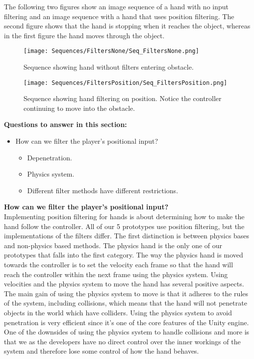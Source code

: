 The following two figures show an image sequence of a hand with no input filtering and an image sequence with a hand that uses position filtering. The second figure shows that the hand is stopping when it reaches the object, whereas in the first figure the hand moves through the object.

\begin{figure}[H]
\centering
\texttt{[image: Sequences/FiltersNone/Seq\_FiltersNone.png]}
\caption{Sequence showing hand without filters entering obstacle.}
\label{fig:filtersNone}
\end{figure}

\begin{figure}[H]
\centering
\texttt{[image: Sequences/FiltersPosition/Seq\_FiltersPosition.png]}
\caption{Sequence showing hand filtering on position. Notice the controller continuing to move into the obstacle.}
\label{fig:filtersPosition}
\end{figure}

\textbf{Questions to answer in this section:}
\begin{itemize}
\setlength\itemsep{-0.1cm}
\item How can we filter the player's positional input?
\begin{itemize}
\setlength\itemsep{-0.1cm}
\item Depenetration.
\item Physics system.
\item Different filter methods have different restrictions.
\end{itemize}
\end{itemize}

\textbf{How can we filter the player's positional input?}\\
Implementing position filtering for hands is about determining how to make the hand follow the controller. All of our 5 prototypes use position filtering, but the implementations of the filters differ. The first distinction is between physics bases and non-physics based methods. The physics hand is the only one of our prototypes that falls into the first category. The way the physics hand is moved towards the controller is to set the velocity each frame so that the hand will reach the controller within the next frame using the physics system. Using velocities and the physics system to move the hand has several positive aspects. The main gain of using the physics system to move is that it adheres to the rules of the system, including collisions, which means that the hand will not penetrate objects in the world which have colliders. Using the physics system to avoid penetration is very efficient since it's one of the core features of the Unity engine. One of the downsides of using the physics system to handle collisions and more is that we as the developers have no direct control over the inner workings of the system and therefore lose some control of how the hand behaves.

